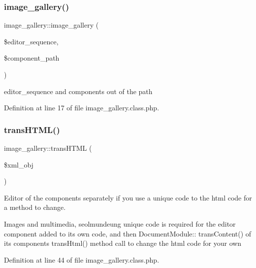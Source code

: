 \hypertarget{classimage__gallery_a61f93b0e279db69d5476ed16ec428200}{}\label{classimage__gallery_a61f93b0e279db69d5476ed16ec428200} 
\subsubsection{\texorpdfstring{image\+\_\+gallery()}{image\_gallery()}}
{\footnotesize\ttfamily image\+\_\+gallery\+::image\+\_\+gallery (\begin{DoxyParamCaption}\item[{}]{\$editor\+\_\+sequence,  }\item[{}]{\$component\+\_\+path }\end{DoxyParamCaption})}



editor\+\_\+sequence and components out of the path 



Definition at line 17 of file image\+\_\+gallery.\+class.\+php.

\hypertarget{classimage__gallery_a7e147e64f848be078e9171b061dd70ad}{}\label{classimage__gallery_a7e147e64f848be078e9171b061dd70ad} 
\subsubsection{\texorpdfstring{trans\+H\+T\+M\+L()}{transHTML()}}
{\footnotesize\ttfamily image\+\_\+gallery\+::trans\+H\+T\+ML (\begin{DoxyParamCaption}\item[{}]{\$xml\+\_\+obj }\end{DoxyParamCaption})}



Editor of the components separately if you use a unique code to the html code for a method to change. 

Images and multimedia, seolmundeung unique code is required for the editor component added to its own code, and then Document\+Module\+:\+: trans\+Content() of its components trans\+Html() method call to change the html code for your own 

Definition at line 44 of file image\+\_\+gallery.\+class.\+php.




